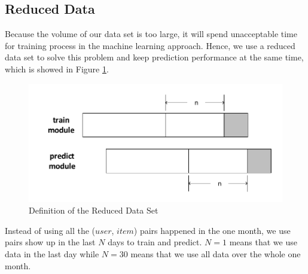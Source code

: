 \documentclass{llncs}
\begin{document}

\subsection{Reduced Data}
Because the volume of our data set is too large,
it will spend unacceptable time for training process
in the machine learning approach.
Hence, we use a reduced data set to solve this problem
and keep prediction performance at the same time,
which is showed in Figure \ref{fig:reduced_data_set}.

\begin{figure}[htbp]
	\centering
	\includegraphics[scale=0.5]{images/reduced_data_set.pdf}
	\caption{Definition of the Reduced Data Set}
	\label{fig:reduced_data_set}
\end{figure}

Instead of using all the ($user$, $item$) pairs happened in the one month,
we use pairs show up in the last $N$ days to train and predict.
$N = 1$ means that we use data in the last day while
$N = 30$ means that we use all data over the whole one month.

\end{document}
